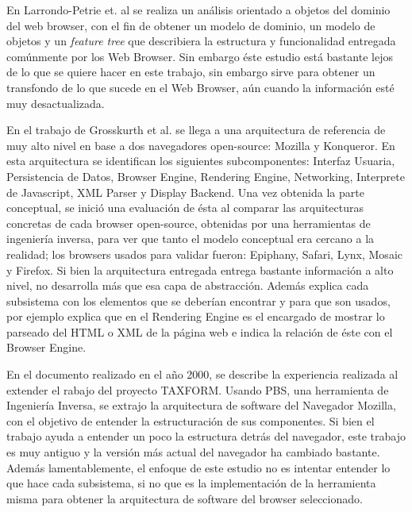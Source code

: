 

En Larrondo-Petrie et. al \cite{535061} se realiza un análisis orientado a objetos del dominio del web browser, con el fin de obtener un modelo de dominio, un modelo de objetos y un \textit{feature tree} que describiera la estructura y funcionalidad entregada comúnmente por los Web Browser. Sin embargo éste estudio está bastante lejos de lo que se quiere hacer en este trabajo, sin embargo sirve para obtener un transfondo de lo que sucede en el Web Browser, aún cuando la información esté muy desactualizada.


En el trabajo de Grosskurth et al. \cite{2005-grosskurth-browser-refarch, preprint-grosskurth-browser-archevol} se llega a una arquitectura de referencia de muy alto nivel en base a dos navegadores open-source: Mozilla y Konqueror. En esta arquitectura se identifican los siguientes subcomponentes: Interfaz Usuaria, Persistencia de Datos, Browser Engine, Rendering Engine, Networking, Interprete de Javascript, XML Parser y Display Backend. Una vez obtenida la parte conceptual, se inició una evaluación de ésta al comparar las arquitecturas concretas de cada browser open-source, obtenidas por una herramientas de ingeniería inversa, para ver que tanto el modelo conceptual era cercano a la realidad; los browsers usados para validar fueron: Epiphany, Safari, Lynx, Mosaic y Firefox. Si bien la arquitectura entregada entrega bastante información a alto nivel, no desarrolla más que esa capa de abstracción. Además explica cada subsistema con los elementos que se deberían encontrar y para que son usados, por ejemplo explica que en el Rendering Engine es el encargado de mostrar lo parseado del HTML o XML de la página web e indica la relación de éste con el Browser Engine. 


En el documento \cite{Godfrey2000} realizado en el año 2000, se describe la experiencia realizada al extender el rabajo del proyecto TAXFORM. Usando PBS, una herramienta de Ingeniería Inversa, se extrajo la arquitectura de software del Navegador Mozilla, con el objetivo de entender la estructuración de sus componentes. Si bien el trabajo ayuda a entender un poco la estructura detrás del navegador, este trabajo es muy antiguo y la versión más actual del navegador ha cambiado bastante. Además lamentablemente, el enfoque de este estudio no es intentar entender lo que hace cada subsistema, si no que es la implementación de la herramienta misma para obtener la arquitectura de software del browser seleccionado.

